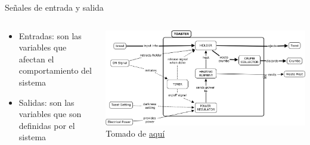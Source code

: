 \documentclass[aspectratio=169]{beamer}
\begin{document}
\begin{frame}{Señales de entrada y salida}
    \begin{columns}[c, onlytextwidth]
        \begin{column}{0.5\textwidth}
             \begin{itemize}
                \item Entradas: son las variables que afectan el comportamiento del sistema
                \item Salidas: son las variables que son definidas por el sistema
             \end{itemize}
        \end{column}
        \begin{column}{0.5\textwidth}
            \begin{center}
               \includegraphics[width=\textwidth]{fig/tostadora.jpg}\\
               \tiny{Tomado de \href{https://deseng.ryerson.ca/dokuwiki/_detail/design:toasterarchitecture.jpg?id=design\%3Asystem_diagram}{aquí}}
            \end{center}
        \end{column}
    \end{columns}
\end{frame}
\end{document}
